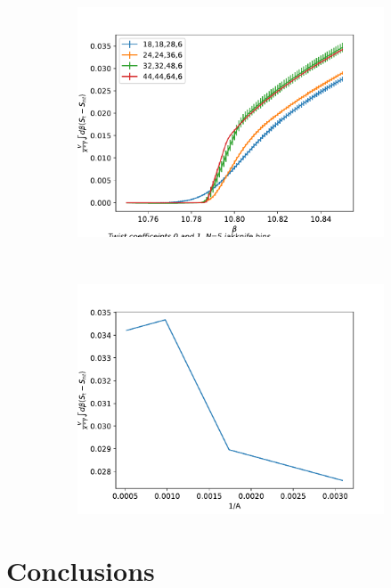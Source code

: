 \documentclass[english,twoside,openright]{UH_TCM_MSc}
\begin{document}
\begin{figure}[htpb]
    \centering
    \begin{subfigure}[t]{0.5\textwidth}
        \centering
        \includegraphics[width=\textwidth]{final_plots/misc/integral.pdf}
        \caption{}
    \end{subfigure}%
    ~ 
    \begin{subfigure}[t]{0.5\textwidth}
        \centering
        \includegraphics[width=\textwidth]{final_plots/misc/inverse_area.pdf}
        \caption{}
    \end{subfigure}
\end{figure}


\chapter{Conclusions}
\end{document}
